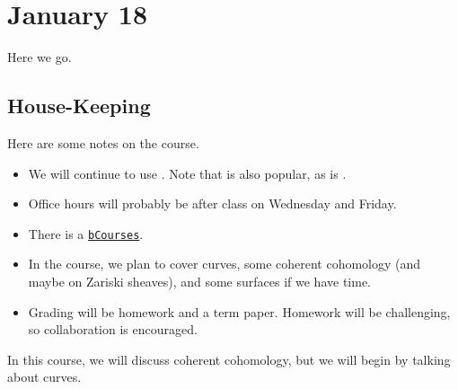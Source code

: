 \documentclass[../notes.tex]{subfiles}
\begin{document}
\section{January 18}

Here we go.

\subsection{House-Keeping}
Here are some notes on the course.
\begin{itemize}
	\item We will continue to use \cite{hartshorne}. Note that \cite{rising-sea} is also popular, as is \cite{stacks}.
	\item Office hours will probably be after class on Wednesday and Friday.
	\item There is a \href{https://bcourses.berkeley.edu/courses/1522162}{\texttt{bCourses}}.
	\item In the course, we plan to cover curves, some coherent cohomology (and maybe on Zariski sheaves), and some surfaces if we have time.
	\item Grading will be homework and a term paper. Homework will be challenging, so collaboration is encouraged.
\end{itemize}
In this course, we will discuss coherent cohomology, but we will begin by talking about curves.
\end{document}
